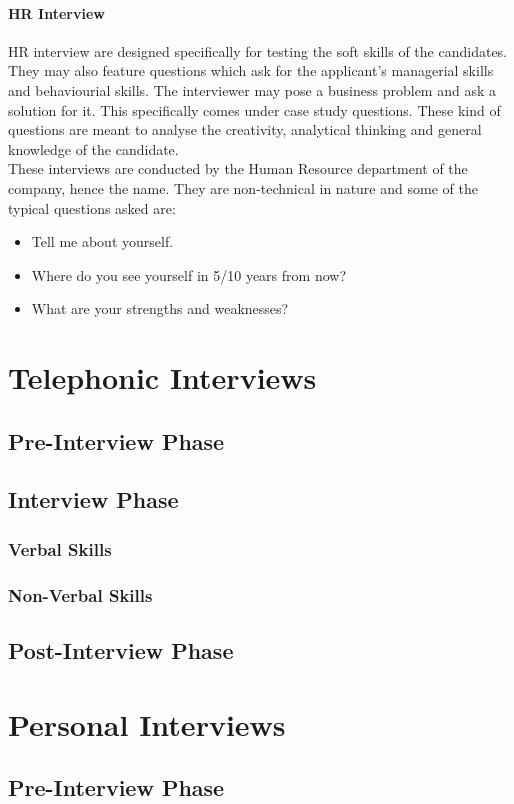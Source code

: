 \documentclass[a4paper,12pt]{report}
\begin{document}
\subsubsection{HR Interview}
HR interview are designed specifically for testing the soft skills of the candidates. They may also feature questions
which ask for the applicant's managerial skills and behaviourial skills. The interviewer may pose a business problem 
and ask a solution for it. This specifically comes under case study questions. These kind of questions are meant to
analyse the creativity, analytical thinking and general knowledge of the candidate.\\
These interviews are conducted by the Human Resource department of the company, hence the name. They are non-technical 
in nature and some of the typical questions asked are:
\begin{itemize}
 \item Tell me about yourself.
 \item Where do you see yourself in 5/10 years from now?
 \item What are your strengths and weaknesses?
\end{itemize}

\chapter{Telephonic Interviews}
\section{Pre-Interview Phase}
\section{Interview Phase}
\subsection{Verbal Skills}
\subsection{Non-Verbal Skills}
\section{Post-Interview Phase}
\chapter{Personal Interviews}
\section{Pre-Interview Phase}
\end{document}
